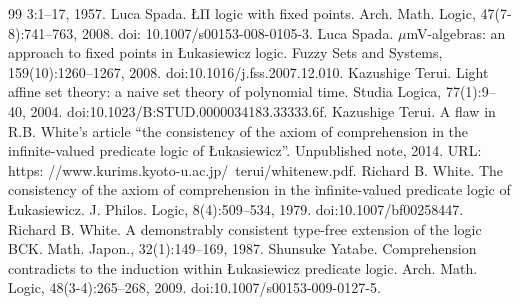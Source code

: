 \documentclass[10pt,a4paper]{article}
\begin{document}
\begin{thebibliography}{99}
3:1–17, 1957.
 Luca Spada. ŁΠ logic with fixed points. Arch. Math. Logic, 47(7-8):741–763, 2008. doi:
10.1007/s00153-008-0105-3.
 Luca Spada. \ensuremath{\mu}mV-algebras: an approach to fixed points in Łukasiewicz logic. Fuzzy Sets and
Systems, 159(10):1260–1267, 2008. doi:10.1016/j.fss.2007.12.010.
 Kazushige Terui. Light affine set theory: a naive set theory of polynomial time. Studia Logica,
77(1):9–40, 2004. doi:10.1023/B:STUD.0000034183.33333.6f.
 Kazushige Terui. A flaw in R.B. White’s article “the consistency of the axiom of comprehension
in the infinite-valued predicate logic of Łukasiewicz”. Unpublished note, 2014. URL: https:
//www.kurims.kyoto-u.ac.jp/~terui/whitenew.pdf.
 Richard B. White. The consistency of the axiom of comprehension in the infinite-valued
predicate logic of Łukasiewicz. J. Philos. Logic, 8(4):509–534, 1979. doi:10.1007/bf00258447.
 Richard B. White. A demonstrably consistent type-free extension of the logic BCK. Math.
Japon., 32(1):149–169, 1987.
 Shunsuke Yatabe. Comprehension contradicts to the induction within Łukasiewicz predicate
logic. Arch. Math. Logic, 48(3-4):265–268, 2009. doi:10.1007/s00153-009-0127-5.
\end{thebibliography}
\end{document}
